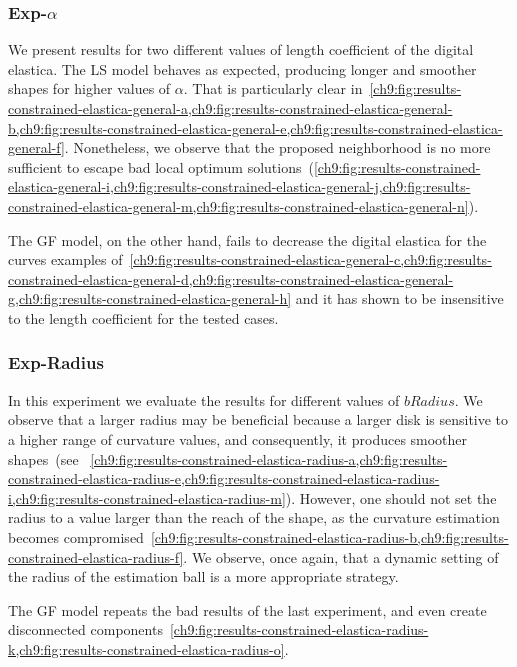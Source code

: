 {\subsubsection{Exp-$\alpha$}
We present results for two different values of length coefficient of the digital elastica. The LS model behaves as expected, producing longer and smoother shapes for higher values of $\alpha$. That is particularly clear in~\cref{ch9:fig:results-constrained-elastica-general-a,ch9:fig:results-constrained-elastica-general-b,ch9:fig:results-constrained-elastica-general-e,ch9:fig:results-constrained-elastica-general-f}. Nonetheless, we observe that the proposed neighborhood is no more sufficient to escape bad local optimum solutions~(\cref{ch9:fig:results-constrained-elastica-general-i,ch9:fig:results-constrained-elastica-general-j,ch9:fig:results-constrained-elastica-general-m,ch9:fig:results-constrained-elastica-general-n}).

The GF model, on the other hand, fails to decrease the digital elastica for the curves examples of~\cref{ch9:fig:results-constrained-elastica-general-c,ch9:fig:results-constrained-elastica-general-d,ch9:fig:results-constrained-elastica-general-g,ch9:fig:results-constrained-elastica-general-h} and it has shown to be insensitive to the length coefficient for the tested cases.

\subsubsection{Exp-Radius}

In this experiment we evaluate the results for different values of $bRadius$. We observe that a larger radius may be beneficial because a larger disk is sensitive to a higher range of curvature values, and consequently, it produces smoother shapes~(see~ \cref{ch9:fig:results-constrained-elastica-radius-a,ch9:fig:results-constrained-elastica-radius-e,ch9:fig:results-constrained-elastica-radius-i,ch9:fig:results-constrained-elastica-radius-m}). However, one should not set the radius to a value larger than the reach of the shape, as the curvature estimation becomes compromised~\cref{ch9:fig:results-constrained-elastica-radius-b,ch9:fig:results-constrained-elastica-radius-f}. We observe, once again, that a dynamic setting of the radius of the estimation ball is a more appropriate strategy.

The GF model repeats the bad results of the last experiment, and even create disconnected components~\cref{ch9:fig:results-constrained-elastica-radius-k,ch9:fig:results-constrained-elastica-radius-o}.
}
